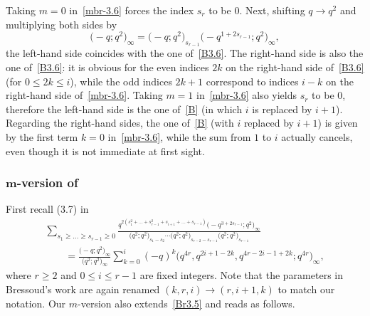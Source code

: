 \documentclass[pdftex]{sigma}
\numberwithin{equation}{section}
\begin{document}
Taking $m=0$ in~\eqref{mbr-3.6} forces the index $s_r$ to be $0$. Next, shifting $q\to q^2$ and multiplying both sides by
\begin{equation*}
\bigl(-q;q^2\bigr)_\infty=\bigl(-q;q^2\bigr)_{s_{r-1}}\bigl(-q^{1+2s_{r-1}};q^2\bigr)_\infty,
\end{equation*}
the left-hand side coincides with the one of~\eqref{B3.6}. The right-hand side is also the one of~\eqref{B3.6}: it is obvious for the even indices $2k$ on the right-hand side of~\eqref{B3.6} (for $0\leq 2k\leq i$), while the odd indices $2k+1$ correspond to indices $i-k$ on the right-hand side of~\eqref{mbr-3.6}. Taking $m=1$ in~\eqref{mbr-3.6} also yields $s_r$ to be $0$, therefore the left-hand side is the one of~\eqref{B} (in which $i$ is replaced by $i+1$). Regarding the right-hand sides, the one of~\eqref{B} (with $i$ replaced by $i+1$) is given by the first term $k=0$ in~\eqref{mbr-3.6}, while the sum from $1$ to $i$ actually cancels, even though it is not immediate at first sight.

\subsubsection[m-version of Ref.~13, equation (3.7)]{$\boldsymbol{m}$-version of \cite[equation (3.7)]{Br80}}
First recall (3.7) in~\cite{Br80}
\begin{gather}
\sum_{s_1\geq\dots\geq s_{r-1}\geq0}\frac{q^{2(s_1^2+\dots+s_{r-1}^2+s_{i+1}+\dots+s_{r-1})}\bigl(-q^{3+2s_{r-1}};q^2\bigr)_\infty}{\bigl(q^2;q^2\bigr)_{s_1-s_2}
\cdots\bigl(q^2;q^2\bigr)_{s_{r-2}-s_{r-1}}\bigl(q^2;q^2\bigr)_{s_{r-1}}}\nonumber\\
\qquad=\frac{\bigl(-q;q^2\bigr)_\infty}{\bigl(q^2;q^2\bigr)_\infty}\sum_{k=0}^{i}(-q)^k\bigl(q^{4r},q^{2i+1-2k},q^{4r-2i-1+2k};q^{4r}\bigr)_\infty,\label{B3.7}
\end{gather}
where $r\geq 2$ and $0\leq i\leq r-1$ are fixed integers. Note that the parameters in Bressoud's work are again renamed $(k,r,i)\to(r,i+1,k)$ to match our notation. Our $m$-version also extends~\eqref{Br3.5} and reads as follows.
\end{document}
